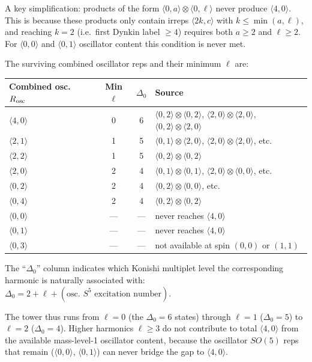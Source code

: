 \documentclass[12pt]{article}
\newcommand{\D}{\ensuremath{\Delta}}
\begin{document}
A key simplification: products of the form $\langle 0,a\rangle\otimes\langle 0,\ell\rangle$
never produce $\langle 4,0\rangle$. This is because these products only contain irreps
$\langle 2k,c\rangle$ with $k\leq\min(a,\ell)$, and reaching $k=2$ (i.e.\ first Dynkin label
$\geq 4$) requires both $a\geq 2$ and $\ell\geq 2$.  For $\langle 0,0\rangle$ and
$\langle 0,1\rangle$ oscillator content this condition is never met.

The surviving combined oscillator reps and their minimum $\ell$ are:

\begin{center}
\begin{tabular}{|l|c|c|l|}
\hline
Combined osc.\ $R_{\rm osc}$ & Min $\ell$ & $\D_0$ & Source \\
\hline
$\langle 4,0\rangle$ & 0 & 6 &
$\langle 0,2\rangle\!\otimes\!\langle 0,2\rangle$,
$\langle 2,0\rangle\!\otimes\!\langle 2,0\rangle$,
$\langle 0,2\rangle\!\otimes\!\langle 2,0\rangle$ \\
$\langle 2,1\rangle$ & 1 & 5 &
$\langle 0,1\rangle\!\otimes\!\langle 2,0\rangle$,
$\langle 2,0\rangle\!\otimes\!\langle 2,0\rangle$, etc. \\
$\langle 2,2\rangle$ & 1 & 5 &
$\langle 0,2\rangle\!\otimes\!\langle 0,2\rangle$ \\
$\langle 2,0\rangle$ & 2 & 4 &
$\langle 0,1\rangle\!\otimes\!\langle 0,1\rangle$,
$\langle 2,0\rangle\!\otimes\!\langle 0,0\rangle$, etc. \\
$\langle 0,2\rangle$ & 2 & 4 &
$\langle 0,2\rangle\!\otimes\!\langle 0,0\rangle$, etc. \\
$\langle 0,4\rangle$ & 2 & 4 &
$\langle 0,2\rangle\!\otimes\!\langle 0,2\rangle$ \\
$\langle 0,0\rangle$ & --- & --- & never reaches $\langle 4,0\rangle$ \\
$\langle 0,1\rangle$ & --- & --- & never reaches $\langle 4,0\rangle$ \\
$\langle 0,3\rangle$ & --- & --- & not available at spin $(0,0)$ or $(1,1)$ \\
\hline
\end{tabular}
\end{center}

The ``$\D_0$'' column indicates which Konishi multiplet level the corresponding
harmonic is naturally associated with: $\D_0=2+\ell+(\text{osc.\ $S^5$ excitation number})$.

The tower thus runs from $\ell=0$ (the $\D_0=6$ states) through $\ell=1$ ($\D_0=5$) to $\ell=2$
($\D_0=4$). Higher harmonics $\ell\geq 3$ do not contribute to total $\langle 4,0\rangle$
from the available mass-level-1 oscillator content, because the oscillator $SO(5)$ reps
that remain ($\langle 0,0\rangle$, $\langle 0,1\rangle$) can never bridge the gap to
$\langle 4,0\rangle$.
\end{document}
